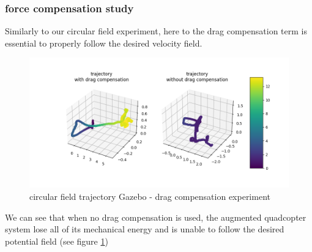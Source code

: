 \subsubsection{force compensation study}
Similarly to our circular field experiment, here to the drag compensation term is essential to properly follow the desired velocity field. 
\begin{figure}[h!]
   \centering
   \includegraphics[width=\linewidth]{Images/gazebo_trajectory_fcomp_potential.png}
   \caption{circular field trajectory Gazebo - drag compensation experiment}
   \label{fig:trajgazebopotentialfcomp}
\end{figure}
We can see that when no drag compensation is used, the augmented quadcopter system lose all of its mechanical energy and is unable to follow the desired potential field (see figure \ref{fig:trajgazebopotentialfcomp})
